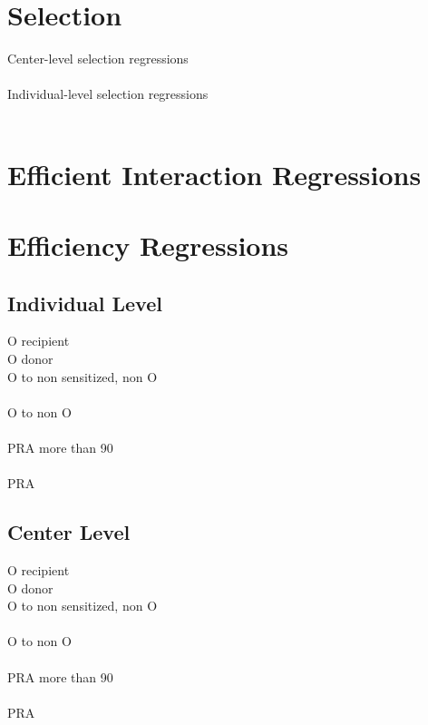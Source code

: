 \documentclass{article}
\begin{document}
\section{Selection}
Center-level selection regressions \\
 \\


Individual-level selection regressions \\
 \\
\section{Efficient Interaction Regressions}



\section{Efficiency Regressions}
\subsection{Individual Level}
O recipient \\

O donor \\

O to non sensitized, non O \\
 \\
O to non O \\
 \\
PRA more than 90 \\
 \\
PRA \\
 


\subsection{Center Level}
O recipient \\

O donor \\

O to non sensitized, non O \\
 \\
O to non O \\
 \\
PRA more than 90 \\
 \\
PRA \\
 
\end{document}

